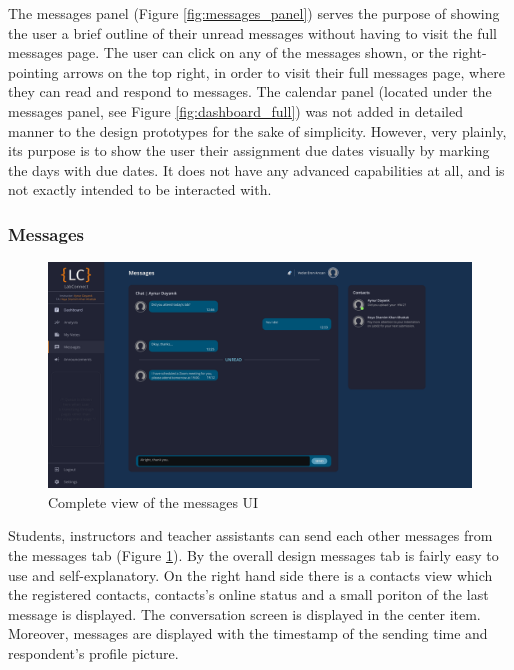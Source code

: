 \documentclass[a4paper, 12pt]{article}
\begin{document}
    The messages panel (Figure \ref{fig:messages_panel}) serves the purpose of showing the user a brief outline of their unread messages
    without having to visit the full messages page. The user can click on any of the messages shown, or the right-pointing arrows on the top right,
    in order to visit their full messages page, where they can read and respond to messages.
    The calendar panel (located under the messages panel, see Figure \ref{fig:dashboard_full}) was not added in detailed manner
    to the design prototypes for the sake of simplicity.
    However, very plainly, its purpose is to show the user their assignment due dates visually by marking the days with due dates. 
    It does not have any advanced capabilities at all, and is not exactly intended to be interacted with.
    
    \pagebreak
    
    \subsubsection{Messages}
    
    \begin{figure}[H]
        \centering
        \includegraphics[width=\textwidth]{messages}
        \caption{Complete view of the messages UI}
        \label{fig:messages_full}
    \end{figure}
    
    Students, instructors and teacher assistants can send each other messages from the messages tab (Figure \ref{fig:messages_full}). By the overall design messages tab is fairly easy to use and
    self-explanatory. On the right hand side there is a contacts view which the registered contacts, contacts's online status and a small poriton of the last message is displayed.
    The conversation screen is displayed in the center item. Moreover, messages are displayed with the timestamp of the sending time and respondent's profile picture. 
    
\end{document}
